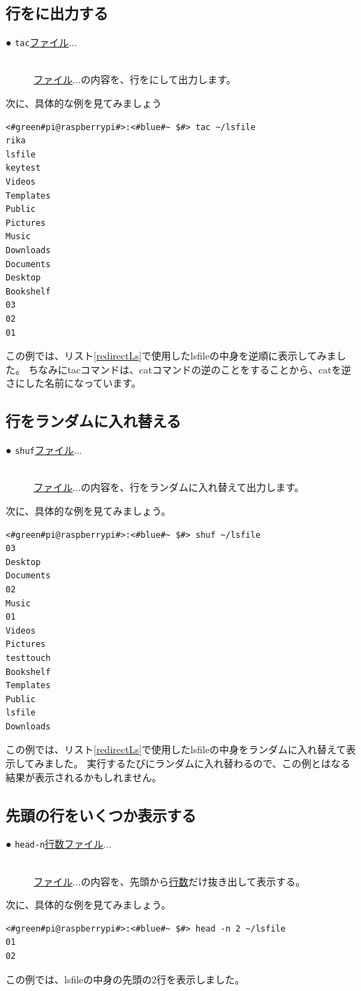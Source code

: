 \subsection{行をに出力する}
\begin{description}
    \item[● \texttt{tac}\textvisiblespace \underline{ファイル}$\ldots$]\mbox{}\\
    \underline{ファイル}$\ldots$の内容を、行をにして出力します。
\end{description}
次に、具体的な例を見てみましょう
\begin{lstlisting}[caption=tacコマンドの実行例, label=tac_example]
<#green#pi@raspberrypi#>:<#blue#~ $#> tac ~/lsfile
rika
lsfile
keytest
Videos
Templates
Public
Pictures
Music
Downloads
Documents
Desktop
Bookshelf
03
02
01 
\end{lstlisting}
この例では、リスト\ref{redirectLs}で使用したlsfileの中身を逆順に表示してみました。
ちなみにtacコマンドは、catコマンドの逆のことをすることから、catを逆さにした名前になっています。


\subsection{行をランダムに入れ替える}
\begin{description}
    \item[● \texttt{shuf}\textvisiblespace \underline{ファイル}$\ldots$]\mbox{}\\
    \underline{ファイル}$\ldots$の内容を、行をランダムに入れ替えて出力します。
\end{description}
次に、具体的な例を見てみましょう。
\begin{lstlisting}[caption=shufコマンドの実行例, label=shuf_example]
<#green#pi@raspberrypi#>:<#blue#~ $#> shuf ~/lsfile
03
Desktop
Documents
02
Music
01
Videos
Pictures
testtouch
Bookshelf
Templates
Public
lsfile
Downloads
\end{lstlisting}
この例では、リスト\ref{redirectLs}で使用したlsfileの中身をランダムに入れ替えて表示してみました。
実行するたびにランダムに入れ替わるので、この例とはなる結果が表示されるかもしれません。

\subsection{先頭の行をいくつか表示する}
\begin{description}
    \item[● \texttt{head}\textvisiblespace \texttt{-n}\textvisiblespace \underline{行数}\textvisiblespace \underline{ファイル}$\ldots$ ]\mbox{}\\
    \underline{ファイル}$\ldots$の内容を、先頭から\underline{行数}だけ抜き出して表示する。
\end{description}
次に、具体的な例を見てみましょう。
\begin{lstlisting}[caption=headコマンドの実行例, label=shuf_example]
<#green#pi@raspberrypi#>:<#blue#~ $#> head -n 2 ~/lsfile
01
02
\end{lstlisting}
この例では、lsfileの中身の先頭の2行を表示しました。

